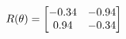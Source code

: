 \documentclass[preview]{standalone}
\begin{document}
\begin{align*}
\special{dvisvgm:raw <g id='unique000'>}R(\theta) = \begin{bmatrix}-0.34 & -0.94\\0.94 & -0.34\end{bmatrix}\special{dvisvgm:raw </g>}
\end{align*}
\end{document}
